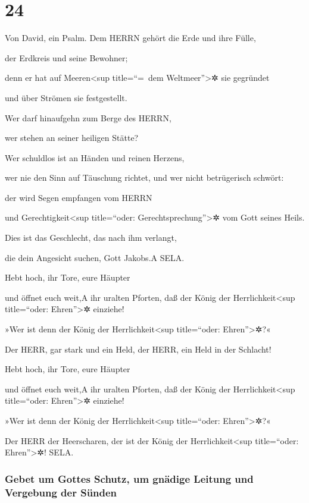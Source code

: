 \hypertarget{section-23}{%
\section{24}\label{section-23}}

Von David, ein Psalm. Dem HERRN gehört die Erde und ihre
Fülle,

der Erdkreis und seine Bewohner;

denn er hat auf Meeren\textless sup title=``=~dem
Weltmeer''\textgreater✲ sie gegründet

und über Strömen sie festgestellt.

Wer darf hinaufgehn zum Berge des HERRN,

wer stehen an seiner heiligen Stätte?

Wer schuldlos ist an Händen und reinen Herzens,

wer nie den Sinn auf Täuschung richtet, und wer nicht betrügerisch
schwört:

der wird Segen empfangen vom HERRN

und Gerechtigkeit\textless sup title=``oder:
Gerechtsprechung''\textgreater✲ vom Gott seines Heils.

Dies ist das Geschlecht, das nach ihm verlangt,

die dein Angesicht suchen, Gott Jakobs.{A} SELA.

Hebt hoch, ihr Tore, eure Häupter

und öffnet euch weit,{A} ihr uralten Pforten, daß der König der
Herrlichkeit\textless sup title=``oder: Ehren''\textgreater✲ einziehe!

»Wer ist denn der König der Herrlichkeit\textless sup
title=``oder: Ehren''\textgreater✲?«

Der HERR, gar stark und ein Held, der HERR, ein Held in der Schlacht!

Hebt hoch, ihr Tore, eure Häupter

und öffnet euch weit,{A} ihr uralten Pforten, daß der König der
Herrlichkeit\textless sup title=``oder: Ehren''\textgreater✲ einziehe!

»Wer ist denn der König der Herrlichkeit\textless sup
title=``oder: Ehren''\textgreater✲?«

Der HERR der Heerscharen, der ist der König der
Herrlichkeit\textless sup title=``oder: Ehren''\textgreater✲! SELA.

\hypertarget{gebet-um-gottes-schutz-um-gnuxe4dige-leitung-und-vergebung-der-suxfcnden}{%
\subsubsection{Gebet um Gottes Schutz, um gnädige Leitung und Vergebung
der
Sünden}\label{gebet-um-gottes-schutz-um-gnuxe4dige-leitung-und-vergebung-der-suxfcnden}}

